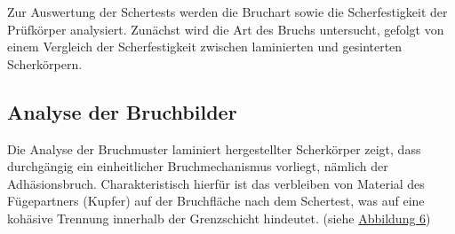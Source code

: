 \begin{table}[H]
\centering

\adjustbox{max width=\textwidth}{



\renewcommand{\arraystretch}{1.7} %
\fontsize{18pt}{20pt}\selectfont
\begin{tabular}{|l|c|c|c|c|}
\hline
\textbf{Scherkörper} & \multicolumn{1}{l|}{\textbf{Maximale Scherkraft} {[}\si{\newton}{]}} & \multicolumn{1}{l|}{\textbf{Durchschnittskraft} {[}\si{\newton}{]}} & \multicolumn{1}{l|}{\textbf{Fläche} {[}\si{\milli\meter\squared}{]}} & \multicolumn{1}{l|}{\textbf{Scherfestigkeit} {[}\si{\newton\per\milli\meter\squared}{]}} \\ \hline
\textbf{1} & 195,05 & 77,34 & 5,29 & 36,87 \\ \hline
\textbf{2} & 146,72 & 55,16 & 5,29 & 27,74 \\ \hline
\textbf{3} & 143,32 & 47,98 & 5,29 & 27,09 \\ \hline
\textbf{4} & 129,39 & 39,87 & 5,29 & 24,46 \\ \hline
\textbf{5} & 142,67 & 54,48 & 5,29 & 26,97 \\ \hline
\textbf{6} & 128,16 & 51,59 & 5,29 & 24,23 \\ \hline
\textbf{7} & 147,18 & 70,87 & 5,29 & 27,82 \\ \hline
\textbf{8} & 131,37 & 49,35 & 5,29 & 24,83 \\ \hline
\textbf{9} & 175,58 & 78,33 & 5,29 & 33,19 \\ \hline
\end{tabular}}
\vspace{0.5cm}
\caption{Messung der laminierten Scherkörper}
\label{Tab.2}
\end{table}

Zur Auswertung der Schertests werden die Bruchart sowie die Scherfestigkeit der Prüfkörper analysiert. Zunächst wird die Art des Bruchs untersucht, gefolgt von einem Vergleich der Scherfestigkeit zwischen laminierten und gesinterten Scherkörpern.

\subsection{Analyse der Bruchbilder}

Die Analyse der Bruchmuster laminiert hergestellter Scherkörper zeigt, dass durchgängig ein einheitlicher Bruchmechanismus vorliegt, nämlich der Adhäsionsbruch. Charakteristisch hierfür ist das verbleiben von Material des Fügepartners (Kupfer) auf der Bruchfläche nach dem Schertest, was auf eine kohäsive Trennung innerhalb der Grenzschicht hindeutet. (siehe \hyperref[lamWhats]{Abbildung 6})

